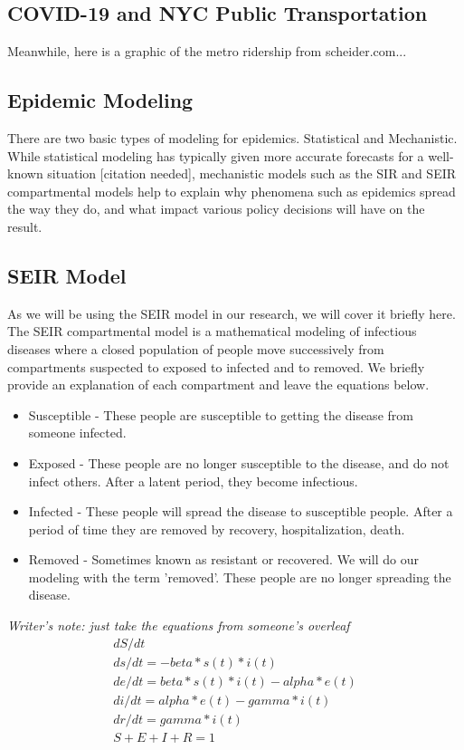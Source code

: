 \documentclass[12pt, a4, epsf] {article}
\theoremstyle{plain}
\theoremstyle{definition}
\begin{document}
\subsection*{COVID-19 and NYC Public Transportation}
Meanwhile, here is a graphic of the metro ridership from scheider.com...

\subsection*{Epidemic Modeling}
There are two basic types of modeling for epidemics. Statistical and Mechanistic. While statistical modeling has typically given more accurate forecasts for a well-known situation [citation needed], mechanistic models such as the SIR and SEIR compartmental models help to explain why phenomena such as epidemics spread the way they do, and what impact various policy decisions will have on the result.
\subsection*{SEIR Model}
As we will be using the SEIR model in our research, we will cover it briefly here. The SEIR compartmental model is a mathematical modeling of infectious diseases where a closed population of people move successively from compartments suspected to exposed to infected and to removed. We briefly provide an explanation of each compartment and leave the equations below.
\begin{itemize}
	\item Susceptible - These people are susceptible to getting the disease from someone infected.
	\item Exposed - These people are no longer susceptible to the disease, and do not infect others. After a latent period, they become infectious.
	\item Infected - These people will spread the disease to susceptible people. After a period of time they are removed by recovery, hospitalization, death.
	\item Removed - Sometimes known as resistant or recovered. We will do our modeling with the term 'removed'. These people are no longer spreading the disease.
\end{itemize}
\textit{Writer's note: just take the equations from someone's overleaf}
\begin{align*}
dS/dt \\
ds/dt = - beta * s(t) * i(t) \\
de/dt = beta * s(t) * i(t) - alpha * e(t) \\
di/dt = alpha * e(t) - gamma * i(t) \\
dr/dt = gamma * i(t) \\
S + E + I + R = 1 \\
\end{align*}
\end{document}
